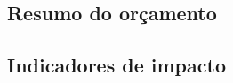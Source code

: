 
\subsection{Resumo do orçamento}
\label{ssec:orca}

\subsection{Indicadores de impacto}
\label{ssec:impact}


